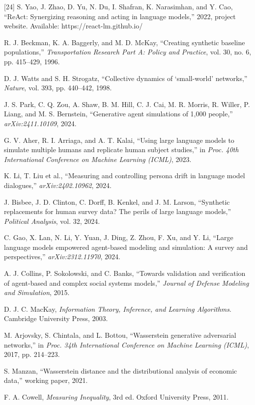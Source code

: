 {[24] S. Yao, J. Zhao, D. Yu, N. Du, I. Shafran, K. Narasimhan, and Y. Cao, ``ReAct: Synergizing reasoning and acting in language models,'' 2022, project website. Available: https://react-lm.github.io/\par\smallskip
[25] R. J. Beckman, K. A. Baggerly, and M. D. McKay, ``Creating synthetic baseline populations,'' \textit{Transportation Research Part A: Policy and Practice}, vol. 30, no. 6, pp. 415--429, 1996.\par\smallskip
[26] D. J. Watts and S. H. Strogatz, ``Collective dynamics of `small-world' networks,'' \textit{Nature}, vol. 393, pp. 440--442, 1998.\par\smallskip
[27] J. S. Park, C. Q. Zou, A. Shaw, B. M. Hill, C. J. Cai, M. R. Morris, R. Willer, P. Liang, and M. S. Bernstein, ``Generative agent simulations of 1,000 people,'' \textit{arXiv:2411.10109}, 2024.\par\smallskip
[28] G. V. Aher, R. I. Arriaga, and A. T. Kalai, ``Using large language models to simulate multiple humans and replicate human subject studies,'' in \textit{Proc. 40th International Conference on Machine Learning (ICML)}, 2023.\par\smallskip
[29] K. Li, T. Liu et al., ``Measuring and controlling persona drift in language model dialogues,'' \textit{arXiv:2402.10962}, 2024.\par\smallskip
[30] J. Bisbee, J. D. Clinton, C. Dorff, B. Kenkel, and J. M. Larson, ``Synthetic replacements for human survey data? The perils of large language models,'' \textit{Political Analysis}, vol. 32, 2024.\par\smallskip
[31] C. Gao, X. Lan, N. Li, Y. Yuan, J. Ding, Z. Zhou, F. Xu, and Y. Li, ``Large language models empowered agent-based modeling and simulation: A survey and perspectives,'' \textit{arXiv:2312.11970}, 2024.\par\smallskip
[32] A. J. Collins, P. Sokolowski, and C. Banks, ``Towards validation and verification of agent-based and complex social systems models,'' \textit{Journal of Defense Modeling and Simulation}, 2015.\par\smallskip
[33] D. J. C. MacKay, \textit{Information Theory, Inference, and Learning Algorithms}. Cambridge University Press, 2003.\par\smallskip
[34] M. Arjovsky, S. Chintala, and L. Bottou, ``Wasserstein generative adversarial networks,'' in \textit{Proc. 34th International Conference on Machine Learning (ICML)}, 2017, pp. 214--223.\par\smallskip
[35] S. Manzan, ``Wasserstein distance and the distributional analysis of economic data,'' working paper, 2021.\par\smallskip
[36] F. A. Cowell, \textit{Measuring Inequality}, 3rd ed. Oxford University Press, 2011.\par\medskip

}
